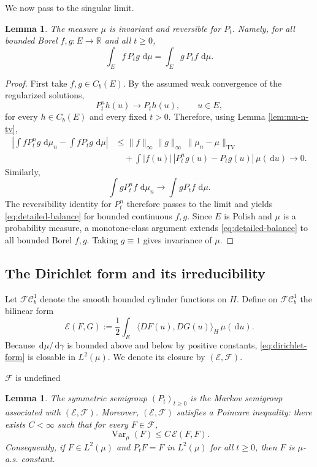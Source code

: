 \documentclass[12pt]{article}
\numberwithin{equation}{section}
\newtheorem{lemma}[theorem]{Lemma}
\newcommand{\dd}{\,\mathrm d}
\newcommand{\1}{\mathbf 1}
\newcommand{\R}{\mathbb R}
\newcommand{\cE}{\mathcal E}
\newcommand{\cF}{\mathcal F}
\newcommand{\Var}{\operatorname{Var}}
\newcommand{\review}[1]{\begin{reviewbox}#1\end{reviewbox}}
\begin{document}
We now pass to the singular limit.

\begin{lemma}\label{lem:limit-reversible}
The measure $\mu$ is invariant and reversible for $P_t$. Namely, for all bounded
Borel $f,g:E\to\R$ and all $t\geq0$,
\begin{equation}\label{eq:detailed-balance}
        \int_E f\,P_tg\,\dd\mu
        =
        \int_E g\,P_tf\,\dd\mu .
\end{equation}
\end{lemma}

\begin{proof}
First take $f,g\in C_b(E)$. By the assumed weak convergence of the regularized
solutions,
\[
        P_t^n h(u)\longrightarrow P_t h(u),\qquad u\in E,
\]
for every $h\in C_b(E)$ and every fixed $t>0$. Therefore, using Lemma
\ref{lem:mu-n-tv},
\[
\begin{aligned}
\left|\int fP_t^ng\,\dd\mu_n-\int fP_tg\,\dd\mu\right|
&\leq
\|f\|_\infty\|g\|_\infty\,\|\mu_n-\mu\|_{\mathrm{TV}}        \\
&\quad
+\int |f(u)|\,|P_t^ng(u)-P_tg(u)|\,\mu(\dd u)
\longrightarrow0.
\end{aligned}
\]
Similarly,
\[
        \int gP_t^nf\,\dd\mu_n\longrightarrow \int gP_tf\,\dd\mu .
\]
The reversibility identity for $P_t^n$ therefore passes to the limit and yields
\eqref{eq:detailed-balance} for bounded continuous $f,g$. Since $E$ is Polish and
$\mu$ is a probability measure, a monotone-class argument extends
\eqref{eq:detailed-balance} to all bounded Borel $f,g$. Taking $g\equiv1$ gives
invariance of $\mu$.
\end{proof}

\subsection{The Dirichlet form and its irreducibility}

Let $\mathcal{FC}_b^1$ denote the smooth bounded cylinder functions on $H$. Define
on $\mathcal{FC}_b^1$ the bilinear form
\begin{equation}\label{eq:dirichlet-form}
        \cE(F,G)
        :=
        \frac12\int_E \langle DF(u),DG(u)\rangle_H\,\mu(\dd u).
\end{equation}
Because $\dd\mu/\dd\gamma$ is bounded above and below by positive constants,
\eqref{eq:dirichlet-form} is closable in $L^2(\mu)$. We denote its closure by
$(\cE,\cF)$. \review{$\cF$ is undefined}

\begin{lemma}\label{lem:dirichlet-form}
The symmetric semigroup $(P_t)_{t\geq0}$ is the Markov semigroup associated with
$(\cE,\cF)$. Moreover, $(\cE,\cF)$ satisfies a Poincare inequality: there exists
$C<\infty$ such that for every $F\in\cF$,
\begin{equation}\label{eq:poincare}
        \Var_\mu(F)\leq C\,\cE(F,F).
\end{equation}
Consequently, if $F\in L^2(\mu)$ and $P_tF=F$ in $L^2(\mu)$ for all $t\geq0$, then
$F$ is $\mu$-a.s. constant.
\end{lemma}
\end{document}
